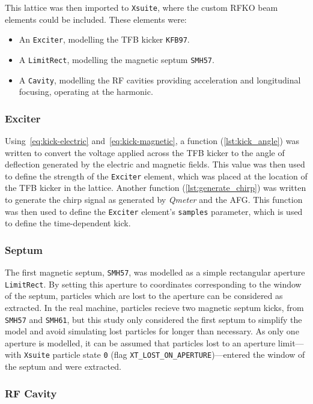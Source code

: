 \documentclass[11pt]{report}
\begin{document}
This lattice was then imported to \verb|Xsuite|, where the custom RFKO beam elements could be included. These elements were:
\begin{itemize}
  \item An \verb|Exciter|, modelling the TFB kicker \verb|KFB97|.
  \item A \verb|LimitRect|, modelling the magnetic septum \verb|SMH57|.
  \item A \verb|Cavity|, modelling the RF cavities providing acceleration and longitudinal focusing, operating at the  harmonic.
\end{itemize}

\subsubsection{Exciter}
Using~\autoref{eq:kick-electric} and~\autoref{eq:kick-magnetic}, a function (\autoref{lst:kick_angle}) was written to convert the voltage applied across the TFB kicker to the angle of deflection generated by the electric and magnetic fields. This value was then used to define the strength of the \verb|Exciter| element, which was placed at the location of the TFB kicker in the lattice. Another function (\autoref{lst:generate_chirp}) was written to generate the chirp signal as generated by \textit{Qmeter} and the AFG. This function was then used to define the \verb|Exciter| element's \verb|samples| parameter, which is used to define the time-dependent kick. 

\subsubsection{Septum}\label{sec:septum}
The first magnetic septum, \verb|SMH57|, was modelled as a simple rectangular aperture \verb|LimitRect|. By setting this aperture to coordinates corresponding to the window of the septum, particles which are lost to the aperture can be considered as extracted. In the real machine, particles recieve two magnetic septum kicks, from \verb|SMH57| and \verb|SMH61|, but this study only considered the first septum to simplify the model and avoid simulating lost particles for longer than necessary. As only one aperture is modelled, it can be assumed that particles lost to an aperture limit---with \verb|Xsuite| particle state \verb|0| (flag \verb|XT_LOST_ON_APERTURE|)---entered the window of the septum and were extracted. 

\subsubsection{RF Cavity}
\end{document}
